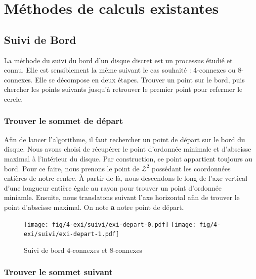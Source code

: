\section{Méthodes de calculs existantes}

\subsection{Suivi de Bord}

La méthode du suivi du bord d'un disque discret est un processus étudié et connu. Elle est sensiblement la même suivant le cas souhaité : 4-connexes ou 8-connexes. Elle se décompose en deux étapes. Trouver un point sur le bord, puis chercher les points suivants jusqu'à retrouver le premier point pour refermer le cercle.

\subsubsection{Trouver le sommet de départ}

Afin de lancer l'algorithme, il faut rechercher un point de départ sur le bord du disque. Nous avons choisi de récupérer le point d'ordonnée minimale et d'abscisse maximal à l'intérieur du disque. Par construction, ce point appartient toujours au bord. Pour ce faire, nous prenons le point de $\mathcal{Z}^2$ possédant les coordonnées entières de notre centre. À partir de là, nous descendons le long de l'axe vertical d'une longueur entière égale au rayon pour trouver un point d'ordonnée miniamle. Ensuite, nous translatons suivant l'axe horizontal afin de trouver le point d'abscisse maximal. On note \textbf{a} notre point de départ. 

\begin{figure}[H]
  \centering
  \texttt{[image: fig/4-exi/suivi/exi-depart-0.pdf]}
  \texttt{[image: fig/4-exi/suivi/exi-depart-1.pdf]}
  \caption{Suivi de bord 4-connexes et 8-connexes}
\end{figure}
  

\subsubsection{Trouver le sommet suivant}

